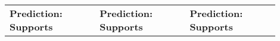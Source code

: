 \begin{table*}[t]
\begin{tabular}{@{}p{0.3\linewidth} p{0.3\linewidth} p{0.3\linewidth} @{}}
                                                                                                                                                                                                                                                                                                                                                                                                                                                                                                                                                                                                                                                                                                                                                                                        \\ \midrule
{\textbf{Prediction:  \color[HTML]{FE0000}  Supports}}                                                                                                                                                                                                                                                                                                                                                                                                                                                                                                                                                                                                                                                                                                                                                                                                                                                                                                                                                                                                                                                                                                                                       & {\textbf{Prediction:  \color[HTML]{FE0000}  Supports}}                                                                                                                                                                                                                                                                                                                                                                                                                                                                                                                                                                                                                                                                                                                                                                                                                                                                                                                                                                                                                                                                                                                                                                                        & {\textbf{Prediction:  \color[HTML]{FE0000}  Supports}}  
\end{tabular}
\end{table*}
